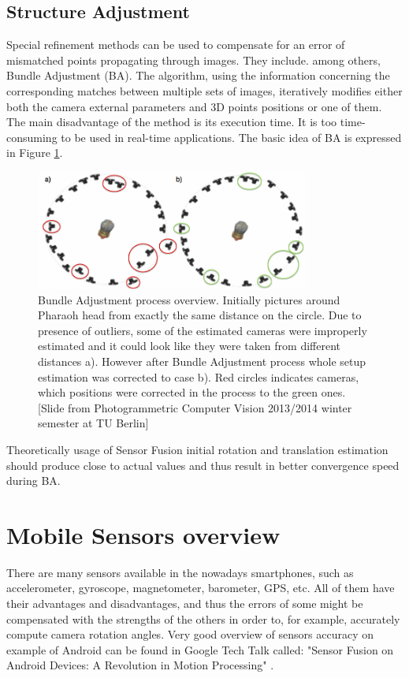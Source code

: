 \subsection{Structure Adjustment}
Special refinement methods can be used to compensate for an error of mismatched points propagating through images. They include. among others, Bundle Adjustment (BA). The algorithm, using the information concerning the corresponding matches between multiple sets of images, iteratively modifies either both the camera external parameters and 3D points positions or one of them\cite{website:bundle-adjustment}. The main disadvantage of the method is its execution time. It is too time-consuming to be used in real-time applications. The basic idea of BA is expressed in Figure \ref{fig:BundleAdjustment}.
\begin{figure}[h]
    \centering
    \includegraphics[width=0.8\textwidth]{BundleAdjustment}
    \caption[Bundle Adjustment process overview]{Bundle Adjustment process overview. Initially pictures around Pharaoh head from exactly the same distance on the circle. Due to presence of outliers, some of the estimated cameras were improperly estimated and  it could look like they were taken from different distances a). However after Bundle Adjustment process whole setup estimation was corrected to case b). Red circles indicates cameras, which positions were corrected in the process to the green ones. [Slide from Photogrammetric Computer Vision 2013/2014 winter semester at TU Berlin]}
    \label{fig:BundleAdjustment}
\end{figure}
Theoretically usage of Sensor Fusion initial rotation and translation estimation should produce close to actual values and thus result in better convergence speed during BA.
\section[Mobile Sensors overview]{Mobile Sensors overview\cite{website:androidSensorOverview}}
There are many sensors available in the nowadays smartphones, such as accelerometer, gyroscope, magnetometer, barometer, GPS, etc. All of them have their advantages and disadvantages, and thus the errors of some might be compensated with the strengths of the others in order to, for example, accurately compute camera rotation angles. Very good overview of sensors accuracy on example of Android can be found in Google Tech Talk called: "Sensor Fusion on Android Devices: A Revolution in Motion Processing" \cite{website:androidSensorFusion}.
